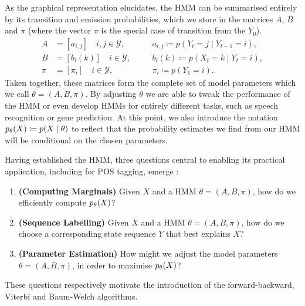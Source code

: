 \documentclass[../main.tex]{subfiles}
\begin{document}
As the graphical representation elucidates, the HMM can be summarised entirely by its transition and emission probabilities, which we store in the matrices $A$, $B$ and $\pi$ (where the vector $\pi$ is the special case of transition from the $Y_0$).
\begin{align*}
    A &= [ a_{i,j} ] \quad i,j \in \mathcal{Y}, & \quad & a_{i,j} \coloneqq p(Y_t = j \mid Y_{t-1} = i), \\
    B  &= [ b_i(k) ] \quad i \in \mathcal{Y}, & \quad  & b_i(k) \coloneqq p(X_t = k \mid Y_t = i), \\
    \pi &= [ \pi_i ] \quad i \in \mathcal{Y}, & \quad & \pi_i \coloneqq p(Y_1 = i).
\end{align*}
Taken together, these matrices form the complete set of model parameters which we call $\theta = (A,B,\pi)$.
By adjusting $\theta$ we are able to tweak the performance of the HMM or even develop HMMs for entirely different tasks, such as speech recognition or gene prediction.
At this point, we also introduce the notation $p_\theta(X) \coloneqq p(X \mid \theta)$ to reflect that the probability estimates we find from our HMM will be conditional on the chosen parameters.

Having established the HMM, three questions central to enabling its practical application, including for POS tagging, emerge \autocite{rabiner-1989-tutorial}:
\begin{enumerate}
    \item{\textbf{(Computing Marginals)}} Given $X$ and a HMM $\theta = (A,B,\pi)$, how do we efficiently compute $p_\theta(X)$? \label{q:key-q1}
    \item{\textbf{(Sequence Labelling)}} Given $X$ and a HMM $\theta = (A,B,\pi)$, how do we choose a corresponding state sequence $Y$ that best explains $X$? \label{q:key-q2}
    \item{\textbf{(Parameter Estimation)}} How might we adjust the model parameters $\theta = (A,B,\pi)$, in order to maximise $p_\theta(X)$? \label{q:key-q3}
\end{enumerate}
These questions respectively motivate the introduction of the forward-backward, Viterbi and Baum-Welch algorithms.
\end{document}
